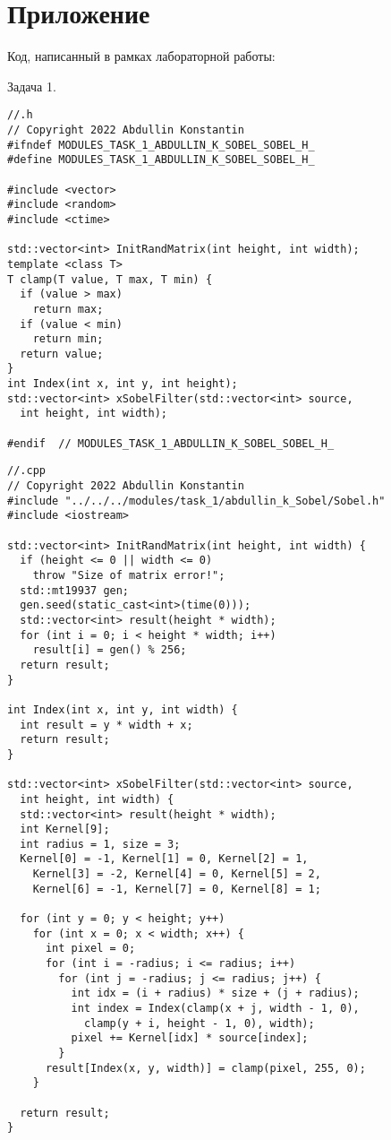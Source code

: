 \documentclass[12pt]{article}
\begin{document}
\section*{Приложение}
Код, написанный в рамках лабораторной работы:
\par Задача 1. 
\begin{lstlisting}
//.h
// Copyright 2022 Abdullin Konstantin
#ifndef MODULES_TASK_1_ABDULLIN_K_SOBEL_SOBEL_H_
#define MODULES_TASK_1_ABDULLIN_K_SOBEL_SOBEL_H_

#include <vector>
#include <random>
#include <ctime>

std::vector<int> InitRandMatrix(int height, int width);
template <class T>
T clamp(T value, T max, T min) {
  if (value > max)
    return max;
  if (value < min)
    return min;
  return value;
}
int Index(int x, int y, int height);
std::vector<int> xSobelFilter(std::vector<int> source,
  int height, int width);

#endif  // MODULES_TASK_1_ABDULLIN_K_SOBEL_SOBEL_H_
\end{lstlisting}
\begin{lstlisting}
//.cpp
// Copyright 2022 Abdullin Konstantin
#include "../../../modules/task_1/abdullin_k_Sobel/Sobel.h"
#include <iostream>

std::vector<int> InitRandMatrix(int height, int width) {
  if (height <= 0 || width <= 0)
    throw "Size of matrix error!";
  std::mt19937 gen;
  gen.seed(static_cast<int>(time(0)));
  std::vector<int> result(height * width);
  for (int i = 0; i < height * width; i++)
    result[i] = gen() % 256;
  return result;
}

int Index(int x, int y, int width) {
  int result = y * width + x;
  return result;
}

std::vector<int> xSobelFilter(std::vector<int> source,
  int height, int width) {
  std::vector<int> result(height * width);
  int Kernel[9];
  int radius = 1, size = 3;
  Kernel[0] = -1, Kernel[1] = 0, Kernel[2] = 1,
    Kernel[3] = -2, Kernel[4] = 0, Kernel[5] = 2,
    Kernel[6] = -1, Kernel[7] = 0, Kernel[8] = 1;

  for (int y = 0; y < height; y++)
    for (int x = 0; x < width; x++) {
      int pixel = 0;
      for (int i = -radius; i <= radius; i++)
        for (int j = -radius; j <= radius; j++) {
          int idx = (i + radius) * size + (j + radius);
          int index = Index(clamp(x + j, width - 1, 0),
            clamp(y + i, height - 1, 0), width);
          pixel += Kernel[idx] * source[index];
        }
      result[Index(x, y, width)] = clamp(pixel, 255, 0);
    }

  return result;
}
\end{lstlisting}
\end{document}
